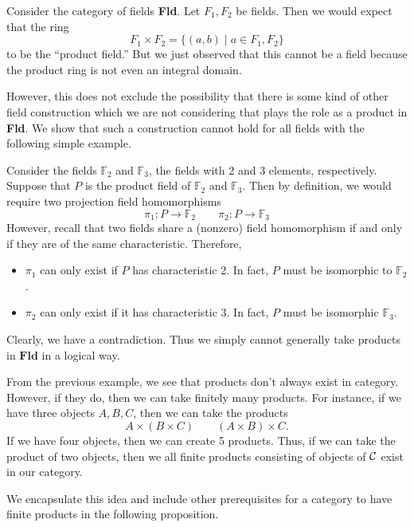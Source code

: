     \begin{example}
        Consider the category of fields \textbf{Fld}. Let $F_1, F_2$ be fields. Then 
        we would expect that the ring 
        \[
            F_1 \times F_2 = \bigg\{ (a, b) \;\bigg|\; a \in F_1, F_2 \bigg\}
        \]
        to be the ``product field.'' But we just observed that this cannot 
        be a field because the product ring is not even an integral domain.

        However, this does not exclude the possibility that there is some kind of 
        other field construction which we are not considering that plays the role as 
        a product in \textbf{Fld}. We show that such a construction cannot 
        hold for all fields with the following simple example.

        Consider the fields $\mathbb{F}_2$ and $\mathbb{F}_3$, the fields with 2 and 3 elements, respectively. 
        Suppose that $P$ is the product field of 
        $\mathbb{F}_2$ and $\mathbb{F}_3$. Then by definition, we would require 
        two projection field homomorphisms
        \[
            \pi_1: P \to \mathbb{F}_2 \qquad \pi_2: P \to \mathbb{F}_3
        \]
        However, recall that two fields share a (nonzero) field homomorphism if and only if 
        they are of the same characteristic. Therefore, 
        \begin{itemize}
            \item $\pi_1$ can only exist if $P$ has characteristic 2. In fact, $P$ must be isomorphic to $\mathbb{F}_2$.
            \item $\pi_2$ can only exist if it has characteristic 3. In fact, $P$ must be isomorphic $\mathbb{F}_3$. 
        \end{itemize}
        Clearly, we have a contradiction.
        Thus we simply cannot generally take products in $\textbf{Fld}$ in a logical way.
    \end{example}

    

From the previous example, we see that products don't always exist in category. 
However, if they do, then we can take finitely many products. For instance, if we have 
three objects $A, B, C$, then we can take the products
\[
    A \times (B \times C) \qquad (A \times B) \times C.
\]
If we have four objects, then we can create 5 products. Thus, if we can take the 
product of two objects, then we all finite products consisting of objects of $\mathcal{C}$ exist 
in our category.

We encapsulate this idea and include other prerequisites for a
category to have finite products in the following proposition. 

